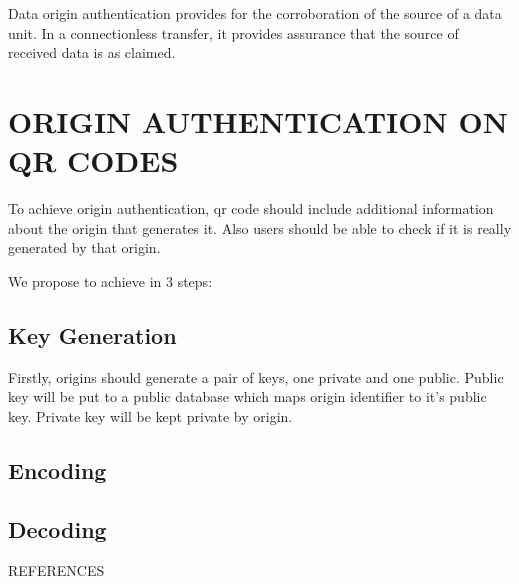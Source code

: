 \documentclass[12pt,journal,compsoc]{IEEEtran}
\begin{document}
Data origin authentication provides for the corroboration of the source
of a data unit. In a connectionless transfer, it provides assurance that
the source of received data is as claimed.


\section{ORIGIN AUTHENTICATION ON QR CODES}

To achieve origin authentication, qr code should include additional information about the origin that generates it. Also users should be able to check if it is really generated by that origin.

We propose to achieve in 3 steps: 


\subsection{Key Generation}

Firstly, origins should generate a pair of keys, one private and one public. Public key will be put to a public database which maps origin identifier to it's public key. Private key will be kept private by origin.

\subsection{Encoding}



\subsection{Decoding}


\begin{thebibliography}{1}

REFERENCES

\end{thebibliography}
\end{document}
